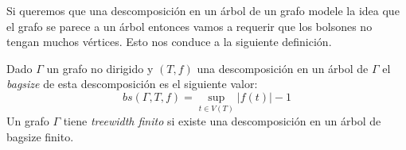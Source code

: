 \documentclass[tesis.tex]{subfiles}
\begin{document}
Si queremos que una descomposición en un árbol de un grafo modele la idea que el grafo se parece a un árbol entonces vamos a requerir que los 
bolsones no tengan muchos vértices. 
Esto nos conduce a la siguiente definición.



\begin{deff}
	Dado $\Gamma$ un grafo no dirigido y $(T,f)$ una descomposición en un árbol de $\Gamma$ el \emph{bagsize} de esta descomposición es el siguiente valor:
	\begin{equation*}
		bs(\Gamma,T,f) = \sup_{t \in V(T)} |f(t)| - 1
	\end{equation*}
	Un grafo $\Gamma$ tiene \emph{treewidth finito} si existe una descomposición en un árbol de bagsize finito.	
\end{deff}
\end{document}
